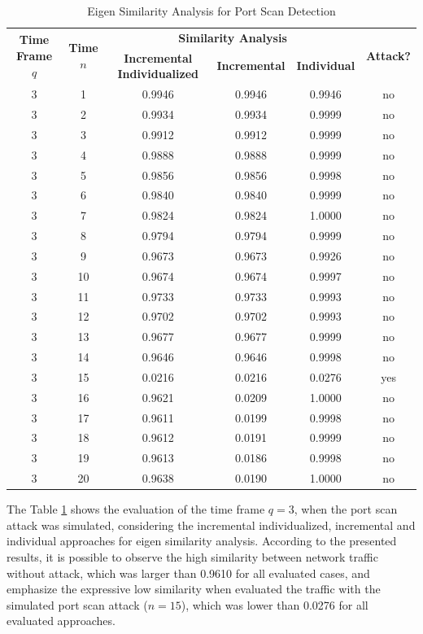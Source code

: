 \documentclass{bmcart}
\begin{document}
\begin{table}[h!]
  \centering
  \footnotesize
  \caption{Eigen Similarity Analysis for Port Scan Detection}
  \label{tab:tab5}
  \begin{tabular}{ c c c c c c }
	\toprule
	\multirow{2}{*}{\textbf{Time Frame} $q$} &\multirow{2}{*}{\textbf{Time} $n$}   &\multicolumn{3}{c}{\textbf{Similarity Analysis}} &\multirow{2}{*}{\textbf{Attack?}}\\ 
			\hhline{~~---~}
			& &\textbf{Incremental Individualized} &\textbf{Incremental} &\textbf{Individual}\\
	\midrule
	3 &1 &0.9946 &0.9946 &0.9946 &no \\
	3 &2 &0.9934 &0.9934 &0.9999 &no \\
	3 &3 &0.9912 &0.9912 &0.9999 &no \\
	3 &4 &0.9888 &0.9888 &0.9999 &no \\
	3 &5 &0.9856 &0.9856 &0.9998 &no \\
	3 &6 &0.9840 &0.9840 &0.9999 &no \\
	3 &7 &0.9824 &0.9824 &1.0000 &no \\
	3 &8 &0.9794 &0.9794 &0.9999 &no \\
	3 &9 &0.9673 &0.9673 &0.9926 &no \\
	3 &10 &0.9674 &0.9674 &0.9997 &no \\
	3 &11 &0.9733 &0.9733 &0.9993 &no \\
	3 &12 &0.9702 &0.9702 &0.9993 &no \\
	3 &13 &0.9677 &0.9677 &0.9999 &no \\
	3 &14 &0.9646 &0.9646 &0.9998 &no \\
	3 &15 &0.0216 &0.0216 &0.0276 &yes \\
	3 &16 &0.9621 &0.0209 &1.0000 &no \\
	3 &17 &0.9611 &0.0199 &0.9998 &no \\
	3 &18 &0.9612 &0.0191 &0.9999 &no \\
	3 &19 &0.9613 &0.0186 &0.9998 &no \\
	3 &20 &0.9638 &0.0190 &1.0000 &no \\
    \bottomrule
  \end{tabular}
\end{table}

The Table \ref{tab:tab5} shows the evaluation of the time frame $q=3$, when the port scan attack was simulated, considering the incremental individualized, incremental and individual approaches for eigen similarity analysis. According to the presented results, it is possible to observe the high similarity between network traffic without attack, which was larger than 0.9610 for all evaluated cases, and emphasize the expressive low similarity when evaluated the traffic with the simulated port scan attack ($n=15$), which was lower than 0.0276 for all evaluated approaches.
\end{document}
